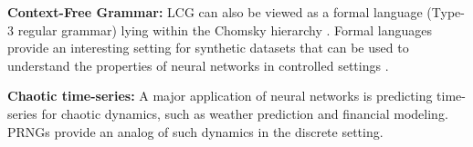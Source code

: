 \textbf{Context-Free Grammar:} LCG can also be viewed as a formal language (Type-3 regular grammar) lying within the Chomsky hierarchy \cite{chomsky1956three}. Formal languages provide an interesting setting for synthetic datasets that can be used to understand the properties of neural networks in controlled settings \cite{deletang2023chomsky,allenzhu2024physicslanguagemodels1,cagnetta2024deep,cagnetta2024towards}. 

\textbf{Chaotic time-series:} A major application of neural networks is predicting time-series for chaotic dynamics, such as weather prediction \cite{lam2023learning} and financial modeling. PRNGs provide an analog of such dynamics in the discrete setting. 

